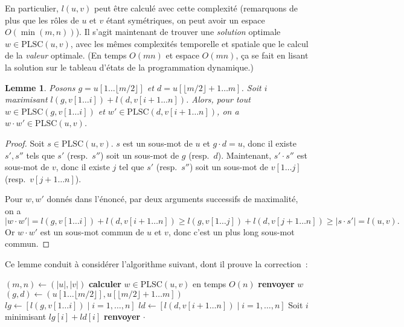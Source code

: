 \documentclass[a4paper, 11pt]{article}
\newtheorem*{lemma}{Lemme}
\begin{document}
En particulier, $l(u,v)$ peut être calculé avec cette complexité (remarquons de
plus que les rôles de $u$ et $v$ étant symétriques, on peut avoir un espace
$O(\min(m,n))$). Il s'agit maintenant de trouver une \emph{solution} optimale $w
\in \mathrm{PLSC}(u,v)$, avec les mêmes complexités temporelle et spatiale que
le calcul de la \emph{valeur} optimale. (En temps $O(mn)$ et espace $O(mn)$, ça
se fait en lisant la solution sur le tableau d'états de la programmation
dynamique.)

\begin{lemma}
  Posons $g = u[1 … \lfloor m/2 \rfloor]$ et $d = u[\lfloor m/2 \rfloor + 1 …
  m]$. Soit $i$ maximisant $l(g, v[1 … i]) + l(d, v[i+1 … n])$. Alors, pour tout
  $w \in \mathrm{PLSC}(g, v[1 … i])$ et $w' \in \mathrm{PLSC}(d, v[i+1 … n])$,
  on a $w \cdot w' \in \mathrm{PLSC}(u,v)$.
\end{lemma}
\begin{proof}
  Soit $s \in \mathrm{PLSC}(u,v)$. $s$ est un sous-mot de $u$ et $g \cdot d =
  u$, donc il existe $s', s''$ tels que $s'$ (resp.\ $s''$) soit un sous-mot de
  $g$ (resp.\ $d$). Maintenant, $s' \cdot s''$ est sous-mot de $v$, donc il
  existe $j$ tel que $s'$ (resp.\ $s''$) soit un sous-mot de $v[1 … j]$ (resp.\
  $v[j+1 … n]$).

  Pour $w, w'$ donnés dans l'énoncé, par deux arguments successifs de
  maximalité, on a
  \[ |w \cdot w'| = l(g, v[1 … i]) + l(d, v[i+1 … n])
    \geq l(g, v[1 … j]) + l(d, v[j+1 … n]) \geq |s \cdot s'| = l(u,v). \]
  Or $w \cdot w'$ est un sous-mot commun de $u$ et $v$, donc c'est un plus long
  sous-mot commun.
\end{proof}

Ce lemme conduit à considérer l'algorithme suivant, dont il prouve la
correction~:

\begin{algorithm}
  \begin{algorithmic}
    \State $(m, n) \gets (|u|,|v|)$
    \State \textbf{calculer} $w \in \mathrm{PLSC}(u,v)$ en temps $O(n)$
    \State \textbf{renvoyer} $w$
    \Else
    \State $(g,d) \gets (u[1 … \lfloor m/2 \rfloor], u[\lfloor m/2 \rfloor + 1…m])$
    \State $lg \gets [l(g, v[1 … i]) \mid i = 1, \ldots, n]$
    \State $ld \gets [l(d, v[i+1 … n]) \mid i = 1, \ldots, n]$
    \State Soit $i$ minimisant $lg[i] + ld[i]$
    \State \textbf{renvoyer}  $\cdot$
    \Call{Hirschberg}{$d,v[i+1…n]$}
    \EndIf
    \EndProcedure
  \end{algorithmic}
\end{algorithm}
\end{document}
